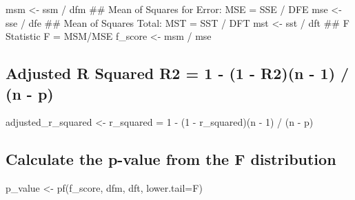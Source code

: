 \documentclass[
]{article}
\begin{document}
msm \textless- ssm / dfm \#\# Mean of Squares for Error: MSE = SSE / DFE
mse \textless- sse / dfe \#\# Mean of Squares Total: MST = SST / DFT mst
\textless- sst / dft \#\# F Statistic F = MSM/MSE f\_score \textless-
msm / mse

\hypertarget{adjusted-r-squared-r2-1---1---r2n---1-n---p}{%
\subsection{Adjusted R Squared R2 = 1 - (1 - R2)(n - 1) / (n -
p)}\label{adjusted-r-squared-r2-1---1---r2n---1-n---p}}

adjusted\_r\_squared \textless- r\_squared = 1 - (1 - r\_squared)(n - 1)
/ (n - p)

\hypertarget{calculate-the-p-value-from-the-f-distribution}{%
\subsection{Calculate the p-value from the F
distribution}\label{calculate-the-p-value-from-the-f-distribution}}

p\_value \textless- pf(f\_score, dfm, dft, lower.tail=F)
\end{document}
